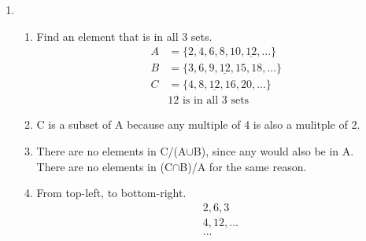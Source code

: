 \documentclass[11pt]{article}
\begin{document}
\begin{enumerate}
    \pagebreak
    \item
        \begin{enumerate}
            \item Find an element that is in all 3 sets.
                \begin{equation*}
                    \begin{split}
                        A&=\{2,4,6,8,10,\underline{12},...\}\\
                        B&=\{3,6,9,\underline{12},15,18,...\}\\
                        C&=\{4,8,\underline{12},16,20,...\}\\
                        &\text{12 is in all 3 sets}
                    \end{split}
                \end{equation*}
            \item C is a subset of A because any multiple of 4 is also a mulitple of 2.
            \item
                There are no elements in C/(A$\cup$B), since any would also be in A.\\
                There are no elements in (C$\cap$B)/A for the same reason.
            \item
                From top-left, to bottom-right.
                \begin{equation*}
                    \begin{split}
                        &2, 6, 3\\
                        &4, 12, ...\\
                        &...
                    \end{split}
                \end{equation*}
        \end{enumerate}     
        

\end{enumerate}
\end{document}
